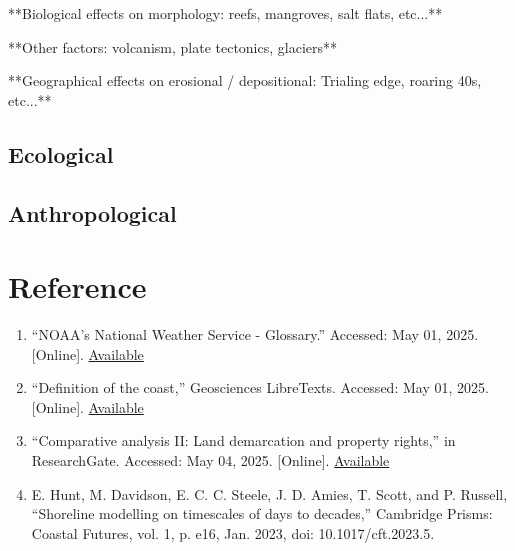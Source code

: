 \documentclass{article}
\begin{document}
{\par{**Biological effects on morphology: reefs, mangroves, salt flats, etc...**}

\par{**Other factors: volcanism, plate tectonics, glaciers**}

\par{**Geographical effects on erosional / depositional: Trialing edge, roaring 40s, etc...**}




\newpage
{}
\fancyfoot[C]{\thepage} 
\thispagestyle{fancy}

\subsection{Ecological}
\subsection{Anthropological}

\newpage
{}
\fancyfoot[C]{\thepage} 
\thispagestyle{fancy}
\section{Reference}

\begin{enumerate}

    \item {“NOAA’s National Weather Service - Glossary.” Accessed: May 01, 2025. [Online]. \href{https://forecast.weather.gov/glossary.php?word=coastal%20waters}{Available}}
    
    \item {“Definition of the coast,” Geosciences LibreTexts. Accessed: May 01, 2025. [Online]. \href{https://geo.libretexts.org/Bookshelves/Oceanography/Coastal_Dynamics_(Bosboom_and_Stive)/01%3A_Overview/1.05%3A_Coastal_(morpho)_dynamics/1.5.01%3A_Definition_of_the_coast}{Available}}
    
    \item {“Comparative analysis II: Land demarcation and property rights,” in ResearchGate. Accessed: May 04, 2025. [Online]. \href{https://www.researchgate.net/publication/362949604_Comparative_analysis_II_Land_demarcation_and_property_rights}{Available}}
    
    \item {E. Hunt, M. Davidson, E. C. C. Steele, J. D. Amies, T. Scott, and P. Russell, “Shoreline modelling on timescales of days to decades,” Cambridge Prisms: Coastal Futures, vol. 1, p. e16, Jan. 2023, doi: 10.1017/cft.2023.5.}


\end{enumerate}}
\end{document}
